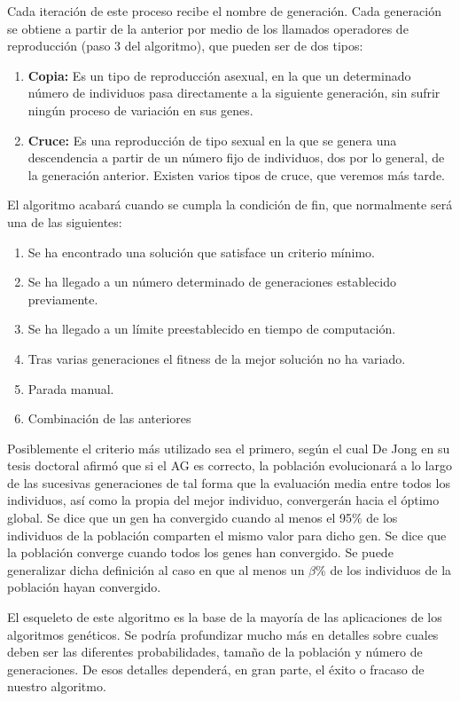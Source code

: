 \documentclass[runningheads]{llncs}
\begin{document}
Cada iteración de este proceso recibe el nombre de generación.
Cada generación se obtiene a partir de la anterior por medio de los llamados operadores de reproducción (paso 3 del algoritmo), 
que pueden ser de dos tipos:

\begin{enumerate}
 \item \textbf{Copia:} Es un tipo de reproducción asexual, en la que un determinado número de individuos pasa directamente a la 
 siguiente generación, sin sufrir ningún proceso de variación en sus genes.
 \item \textbf{Cruce:} Es una reproducción de tipo sexual en la que se genera una descendencia a partir de un número fijo de 
 individuos, dos por lo general, de la generación anterior. Existen varios tipos de cruce, que veremos más tarde.
\end{enumerate}


El algoritmo acabará cuando se cumpla la condición de fin, que normalmente será una de las siguientes:

\begin{enumerate}
 \item Se ha encontrado una solución que satisface un criterio mínimo.
 \item Se ha llegado a un número determinado de generaciones establecido previamente.
 \item Se ha llegado a un límite preestablecido en tiempo de computación.
 \item Tras varias generaciones el fitness de la mejor solución no ha variado.
 \item Parada manual.
 \item Combinación de las anteriores
\end{enumerate}

Posiblemente el criterio más utilizado sea el primero, según el cual De Jong en su tesis doctoral
\cite{John75} afirmó que si el AG es correcto, la población evolucionará a lo largo de las sucesivas generaciones de tal forma que la
evaluación media entre todos los individuos, así como la propia del mejor individuo, convergerán hacia el óptimo global. 
Se dice que un gen ha convergido cuando al menos el 95\% de los individuos de la población comparten el mismo valor para dicho gen. 
Se dice que la población converge cuando todos los genes han convergido. Se puede generalizar dicha definición al caso en que al menos un
$\beta \%$ de los individuos de la población hayan convergido. 

El esqueleto de este algoritmo es la base de la mayoría de las aplicaciones de los algoritmos genéticos. Se podría profundizar mucho más 
en detalles sobre cuales deben ser las diferentes probabilidades, tamaño de la población y número de generaciones. De esos detalles 
dependerá, en gran parte, el éxito o fracaso de nuestro algoritmo.
\end{document}

